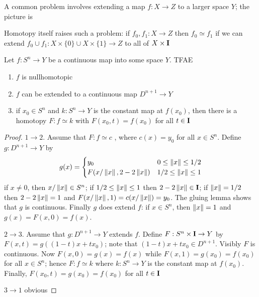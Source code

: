 \documentclass[11pt]{article}
\begin{document}
A common problem involves extending a map \(f:X\to Z\) to a larger space \(Y\); the picture is
\begin{center}\end{center}
Homotopy itself raises such a problem: if \(f_0,f_1:X\to Z\) then \(f_0\simeq f_1\) if we can
extend \(f_0\cup f_1:X\times\{0\}\cup X\times\{1\}\to Z\) to all of \(X\times\operatorname{\textbf{I}}\)

\begin{theorem}[]
\label{thm1.6}
Let \(f:S^n\to Y\) be a continuous map into some space \(Y\). TFAE
\begin{enumerate}
\item \(f\) is nullhomotopic
\item \(f\) can be extended to a continuous map \(D^{n+1}\to Y\)
\item if \(x_0\in S^n\) and \(k:S^n\to Y\) is the constant map at \(f(x_0)\), then there is a
homotopy \(F:f\simeq k\) with \(F(x_0,t)=f(x_0)\) for all \(t\in\operatorname{\textbf{I}}\)
\end{enumerate}
\end{theorem}

\begin{proof}
\(1\to 2\). Assume that \(F:f\simeq c\) , where \(c(x)=y_0\) for all \(x\in S^n\). Define \(g:D^{n+1}\to Y\)
by
\begin{equation*}
g(x)=
\begin{cases}
y_0&0\le\left\lVert x\right\rVert\le 1/2\\
F(x/\left\lVert x\right\rVert,2-2\left\lVert x\right\rVert)&1/2\le\left\lVert x\right\rVert\le 1
\end{cases}
\end{equation*}
if \(x\neq 0\), then \(x/\left\lVert x\right\rVert\in S^n\); if \(1/2\le\left\lVert x\right\rVert\le 1\) then \(2-2\left\lVert x\right\rVert\in\operatorname{\textbf{I}}\);
if \(\left\lVert x\right\rVert=1/2\) then \(2-2\left\lVert x\right\rVert=1\) and \(F(x/\left\lVert x\right\rVert,1)=c(x/\left\lVert x\right\rVert)=y_0\). The gluing
lemma shows that \(g\) is continuous. Finally \(g\) does extend \(f\): if \(x\in S^n\),
then \(\left\lVert x\right\rVert=1\) and \(g(x)=F(x,0)=f(x)\).

\(2\to 3\). Assume that \(g:D^{n+1}\to Y\) extends \(f\). Define \(F:S^n\times\operatorname{\textbf{I}}\to Y\)
by \(F(x,t)=g((1-t)x+tx_0)\); note that \((1-t)x+tx_0\in D^{n+1}\). Visibly \(F\) is continuous.
Now \(F(x,0)=g(x)=f(x)\) while \(F(x,1)=g(x_0)=f(x_0)\) for all \(x\in S^n\); hence \(F:f\simeq k\)
where \(k:S^n\to Y\) is the constant map at \(f(x_0)\). Finally, \(F(x_0,t)=g(x_0)=f(x_0)\) for
all \(t\in\operatorname{\textbf{I}}\)

\(3\to 1\) obvious
\end{proof}
\end{document}
